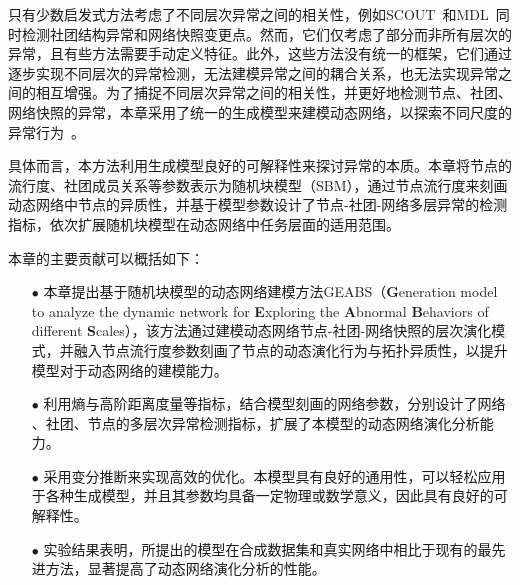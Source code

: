 只有少数启发式方法考虑了不同层次异常之间的相关性，例如SCOUT~\cite{hulovatyy2016scout}和MDL~\cite{cheung2020simultaneous}同时检测社团结构异常和网络快照变更点。然而，它们仅考虑了部分而非所有层次的异常，且有些方法需要手动定义特征。此外，这些方法没有统一的框架，它们通过逐步实现不同层次的异常检测，无法建模异常之间的耦合关系，也无法实现异常之间的相互增强。为了捕捉不同层次异常之间的相关性，并更好地检测节点、社团、网络快照的异常，本章采用了统一的生成模型来建模动态网络，以探索不同尺度的异常行为~\cite{wang2019nodes,cheng2008robust}。 



具体而言，本方法利用生成模型良好的可解释性来探讨异常的本质。本章将节点的流行度、社团成员关系等参数表示为随机块模型（SBM），通过节点流行度来刻画动态网络中节点的异质性，并基于模型参数设计了节点-社团-网络多层异常的检测指标，依次扩展随机块模型在动态网络中任务层面的适用范围。

本章的主要贡献可以概括如下：


\begin{itemize} 
    \item[$\bullet$] 本章提出基于随机块模型的动态网络建模方法GEABS（\textbf{G}eneration model to analyze the dynamic network for \textbf{E}xploring the \textbf{A}bnormal \textbf{B}ehaviors of different \textbf{S}cales），该方法通过建模动态网络节点-社团-网络快照的层次演化模式，并融入节点流行度参数刻画了节点的动态演化行为与拓扑异质性，以提升模型对于动态网络的建模能力。
    \item[$\bullet$] 利用熵与高阶距离度量等指标，结合模型刻画的网络参数，分别设计了网络 、社团、节点的多层次异常检测指标，扩展了本模型的动态网络演化分析能力。
    \item[$\bullet$] 采用变分推断来实现高效的优化。本模型具有良好的通用性，可以轻松应用于各种生成模型，并且其参数均具备一定物理或数学意义，因此具有良好的可解释性。 
    \item[$\bullet$] 实验结果表明，所提出的模型在合成数据集和真实网络中相比于现有的最先进方法，显著提高了动态网络演化分析的性能。
\end{itemize}



